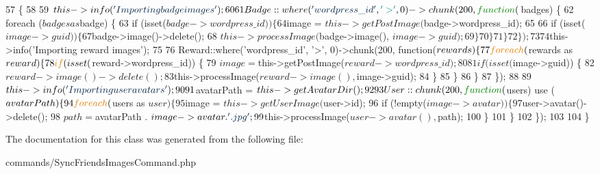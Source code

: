 \begin{DoxyCode}
57     \{
58 
59         $this->info(\textcolor{stringliteral}{'Importing badge images'});
60 
61         Badge::where(\textcolor{stringliteral}{'wordpress\_id'}, \textcolor{charliteral}{'>'}, 0)->chunk(200, \textcolor{keyword}{function}($badges) \{
62             \textcolor{keywordflow}{foreach} ($badges as $badge) \{
63                 \textcolor{keywordflow}{if} (isset($badge->wordpress\_id)) \{
64                     $image = $this->getPostImage($badge->wordpress\_id);
65 
66                     if (isset($image->guid)) \{
67                         $badge->image()->delete();
68                         $this->processImage($badge->image(), $image->guid);
69                     \}
70                 \}
71             \}
72         \});
73 
74         $this->info(\textcolor{stringliteral}{'Importing reward images'});
75 
76         Reward::where(\textcolor{stringliteral}{'wordpress\_id'}, \textcolor{charliteral}{'>'}, 0)->chunk(200, \textcolor{keyword}{function}($rewards) \{
77             \textcolor{keywordflow}{foreach} ($rewards as $reward) \{
78                 \textcolor{keywordflow}{if} (isset($reward->wordpress\_id)) \{
79                     $image = $this->getPostImage($reward->wordpress\_id);
80 
81                     if (isset($image->guid)) \{
82                         $reward->image()->delete();
83                         $this->processImage($reward->image(), $image->guid);
84                     \}
85                 \}
86             \}
87         \});
88 
89         $this->info(\textcolor{stringliteral}{'Importing user avatars'});
90 
91         $avatarPath = $this->getAvatarDir();
92 
93         User::chunk(200, \textcolor{keyword}{function}($users) use ($avatarPath) \{
94             \textcolor{keywordflow}{foreach} ($users as $user) \{
95                 $image = $this->getUserImage($user->id);
96                 \textcolor{keywordflow}{if} (!empty($image->avatar)) \{
97                     $user->avatar()->delete();
98                     $path = $avatarPath . $image->avatar . \textcolor{stringliteral}{'.jpg'};
99                     $this->processImage($user->avatar(), $path);
100                 \}
101             \}
102         \});
103 
104     \}
\end{DoxyCode}


The documentation for this class was generated from the following file\+:\begin{DoxyCompactItemize}
\item 
commands/Sync\+Friends\+Images\+Command.\+php\end{DoxyCompactItemize}
